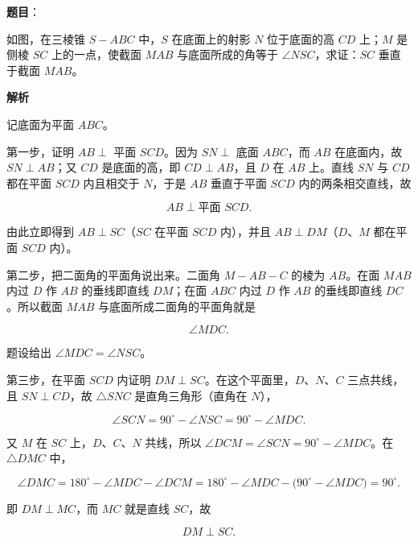\begin{answer}

\textbf{题目}：

如图，在三棱锥 $S-ABC$ 中，$S$ 在底面上的射影 $N$ 位于底面的高 $CD$ 上；$M$ 是侧棱 $SC$ 上的一点，使截面 $MAB$ 与底面所成的角等于 $\angle NSC$，求证：$SC$ 垂直于截面 $MAB$。
\nopagebreak[4]
\begin{center}\end{center}
\nopagebreak[4]
\textbf{解析}
\nopagebreak[4]
\begin{center}\end{center}
\nopagebreak[4]
记底面为平面 $ABC$。

第一步，证明 $AB\perp$ 平面 $SCD$。因为 $SN\perp$ 底面 $ABC$，而 $AB$ 在底面内，故 $SN\perp AB$；又 $CD$ 是底面的高，即 $CD\perp AB$，且 $D$ 在 $AB$ 上。直线 $SN$ 与 $CD$ 都在平面 $SCD$ 内且相交于 $N$，于是 $AB$ 垂直于平面 $SCD$ 内的两条相交直线，故

\nopagebreak[4]
\[
AB\perp\text{平面 }SCD.
\]

由此立即得到 $AB\perp SC$（$SC$ 在平面 $SCD$ 内），并且 $AB\perp DM$（$D$、$M$ 都在平面 $SCD$ 内）。

第二步，把二面角的平面角说出来。二面角 $M-AB-C$ 的棱为 $AB$。在面 $MAB$ 内过 $D$ 作 $AB$ 的垂线即直线 $DM$；在面 $ABC$ 内过 $D$ 作 $AB$ 的垂线即直线 $DC$。所以截面 $MAB$ 与底面所成二面角的平面角就是

\nopagebreak[4]
\[
\angle MDC.
\]

题设给出 $\angle MDC=\angle NSC$。

第三步，在平面 $SCD$ 内证明 $DM\perp SC$。在这个平面里，$D$、$N$、$C$ 三点共线，且 $SN\perp CD$，故 $\triangle SNC$ 是直角三角形（直角在 $N$），

\nopagebreak[4]
\[
\angle SCN=90^\circ-\angle NSC=90^\circ-\angle MDC.
\]

又 $M$ 在 $SC$ 上，$D$、$C$、$N$ 共线，所以 $\angle DCM=\angle SCN=90^\circ-\angle MDC$。在 $\triangle DMC$ 中，

\nopagebreak[4]
\[
\angle DMC=180^\circ-\angle MDC-\angle DCM
=180^\circ-\angle MDC-\bigl(90^\circ-\angle MDC\bigr)=90^\circ.
\]

即 $DM\perp MC$，而 $MC$ 就是直线 $SC$，故

\nopagebreak[4]
\[
DM\perp SC.
\]


\end{answer}
